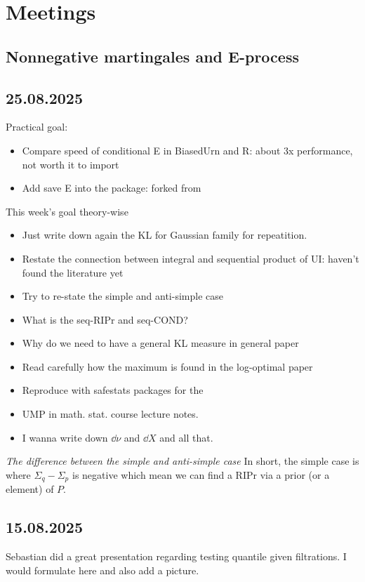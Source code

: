 \newpage

\section{Meetings} 

\subsection{Nonnegative martingales and E-process}



\subsection*{25.08.2025} 
Practical goal:
\begin{itemize}
    \item Compare speed of conditional E in BiasedUrn and R: about 3x performance, not worth it to import
    \item Add save E into the package: forked from
\end{itemize}


This week's goal theory-wise
\begin{itemize}
    \item Just write down again the KL for Gaussian family for repeatition.
    \item Restate the connection between integral and sequential product of UI:
    haven't found the literature yet
    \item Try to re-state the simple and anti-simple case
    \item What is the seq-RIPr and seq-COND?
    \item Why do we need to have a general KL measure in general paper
    \item Read carefully how the maximum is found in the log-optimal paper 
    \item Reproduce with safestats packages for the 
    \item UMP in math. stat. course lecture notes.
    \item I wanna write down $\dd{\nu}$ and $\dd{X}$ and all that.
\end{itemize}

\emph{The difference between the simple and anti-simple case} In short, the simple case
is where $\Sigma_q-\Sigma_p$ is negative which mean we can find a RIPr via a prior (or a element)
of $P$.

\subsection*{15.08.2025} Sebastian did a great presentation regarding testing 
quantile given filtrations. I would formulate here and also add a picture.


